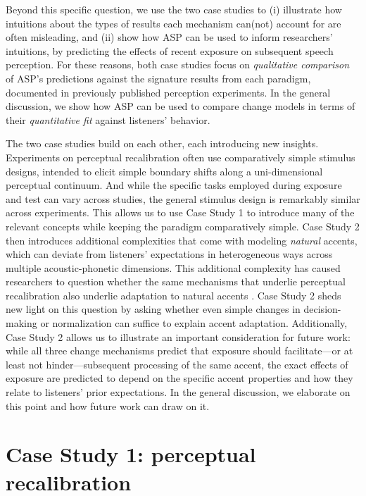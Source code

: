 \documentclass[
  11pt,
  man,floatsintext]{apa6}
\begin{document}
Beyond this specific question, we use the two case studies to (i) illustrate how intuitions about the types of results each mechanism can(not) account for are often misleading, and (ii) show how ASP can be used to inform researchers' intuitions, by predicting the effects of recent exposure on subsequent speech perception. For these reasons, both case studies focus on \emph{qualitative comparison} of ASP's predictions against the signature results from each paradigm, documented in previously published perception experiments. In the general discussion, we show how ASP can be used to compare change models in terms of their \emph{quantitative fit} against listeners' behavior.

The two case studies build on each other, each introducing new insights. Experiments on perceptual recalibration often use comparatively simple stimulus designs, intended to elicit simple boundary shifts along a uni-dimensional perceptual continuum. And while the specific tasks employed during exposure and test can vary across studies, the general stimulus design is remarkably similar across experiments. This allows us to use Case Study 1 to introduce many of the relevant concepts while keeping the paradigm comparatively simple. Case Study 2 then introduces additional complexities that come with modeling \emph{natural} accents, which can deviate from listeners' expectations in heterogeneous ways across multiple acoustic-phonetic dimensions. This additional complexity has caused researchers to question whether the same mechanisms that underlie perceptual recalibration also underlie adaptation to natural accents \autocites[see recent reviews,][]{baeseberk2018,bent-baeseberk2021,zheng-samuel2020}. Case Study 2 sheds new light on this question by asking whether even simple changes in decision-making or normalization can suffice to explain accent adaptation. Additionally, Case Study 2 allows us to illustrate an important consideration for future work: while all three change mechanisms predict that exposure should facilitate---or at least not hinder---subsequent processing of the same accent, the exact effects of exposure are predicted to depend on the specific accent properties and how they relate to listeners' prior expectations. In the general discussion, we elaborate on this point and how future work can draw on it.

\section{Case Study 1: perceptual recalibration}\label{sec:PR}
\end{document}
